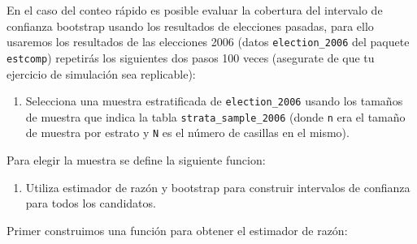 \documentclass[]{article}
\newenvironment{Shaded}{\begin{snugshade}}{\end{snugshade}}
\newcommand{\ControlFlowTok}[1]{\textcolor[rgb]{0.13,0.29,0.53}{\textbf{#1}}}
\newcommand{\DataTypeTok}[1]{\textcolor[rgb]{0.13,0.29,0.53}{#1}}
\newcommand{\DecValTok}[1]{\textcolor[rgb]{0.00,0.00,0.81}{#1}}
\newcommand{\KeywordTok}[1]{\textcolor[rgb]{0.13,0.29,0.53}{\textbf{#1}}}
\newcommand{\NormalTok}[1]{#1}
\newcommand{\OperatorTok}[1]{\textcolor[rgb]{0.81,0.36,0.00}{\textbf{#1}}}
\newcommand{\StringTok}[1]{\textcolor[rgb]{0.31,0.60,0.02}{#1}}
\providecommand{\tightlist}{%
  \setlength{\itemsep}{0pt}\setlength{\parskip}{0pt}}
\begin{document}
En el caso del conteo rápido es posible evaluar la cobertura del
intervalo de confianza bootstrap usando los resultados de elecciones
pasadas, para ello usaremos los resultados de las elecciones 2006 (datos
\texttt{election\_2006} del paquete \texttt{estcomp}) repetirás los
siguientes dos pasos 100 veces (asegurate de que tu ejercicio de
simulación sea replicable):

\begin{enumerate}
\def\labelenumi{\arabic{enumi}.}
\tightlist
\item
  Selecciona una muestra estratificada de \texttt{election\_2006} usando
  los tamaños de muestra que indica la tabla
  \texttt{strata\_sample\_2006} (donde \texttt{n} era el tamaño de
  muestra por estrato y \texttt{N} es el número de casillas en el
  mismo).
\end{enumerate}

Para elegir la muestra se define la siguiente funcion:

\begin{Shaded}
\end{Shaded}

\begin{enumerate}
\def\labelenumi{\arabic{enumi}.}
\setcounter{enumi}{1}
\tightlist
\item
  Utiliza estimador de razón y bootstrap para construir intervalos de
  confianza para todos los candidatos.
\end{enumerate}

Primer construimos una función para obtener el estimador de razón:
\end{document}
